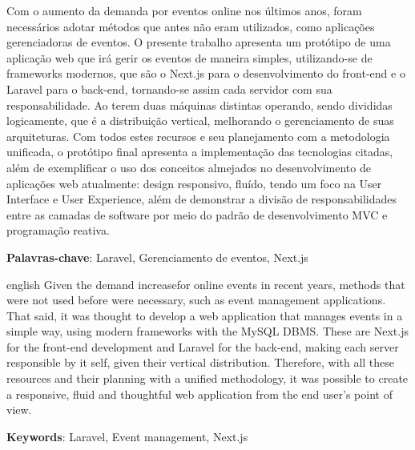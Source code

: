 \documentclass[
	12pt,			%
	openany,		%
	oneside,		%
	a4paper,		%
	english,		%
	brazil			%
	]{abntex2}
\begin{document}
\setlength{\absparsep}{18pt} %

\begin{resumo}
Com o aumento da demanda por eventos online nos últimos anos, foram necessários adotar métodos que antes não eram utilizados, como aplicações gerenciadoras de eventos. O presente trabalho apresenta um protótipo de uma aplicação web que irá gerir os eventos de maneira simples, utilizando-se de frameworks modernos, que são o Next.js para o desenvolvimento do front-end e o Laravel para o back-end, tornando-se assim cada servidor com sua responsabilidade. Ao terem duas máquinas distintas operando, sendo divididas logicamente, que é a distribuição vertical, melhorando o gerenciamento de suas arquiteturas. Com todos estes recursos e seu planejamento com a metodologia unificada, o protótipo final apresenta a implementação das tecnologias citadas, além de exemplificar o uso dos conceitos almejados no desenvolvimento de aplicações web atualmente: design responsivo, fluído, tendo um foco na User Interface e User Experience, além de demonstrar a divisão de responsabilidades entre as camadas de software por meio do padrão de desenvolvimento MVC e programação reativa.

\textbf{Palavras-chave}: Laravel, Gerenciamento de eventos, Next.js
\end{resumo}

\begin{resumo}[Abstract]
\begin{otherlanguage*}{english}
Given the demand increasefor online events in recent years, methods that were not used before were necessary, such as event management applications. That said, it was thought to develop a web application that manages events in a simple way, using modern frameworks with the MySQL DBMS. These are Next.js for the front-end development and Laravel for the back-end, making each server responsible by it self, given their vertical distribution. Therefore, with all these resources and their planning with a unified methodology, it was possible to create a responsive, fluid and thoughtful web application from the end user's point of view.

\textbf{Keywords}: Laravel, Event management, Next.js
\end{otherlanguage*}
\end{resumo}
 


\end{document}
